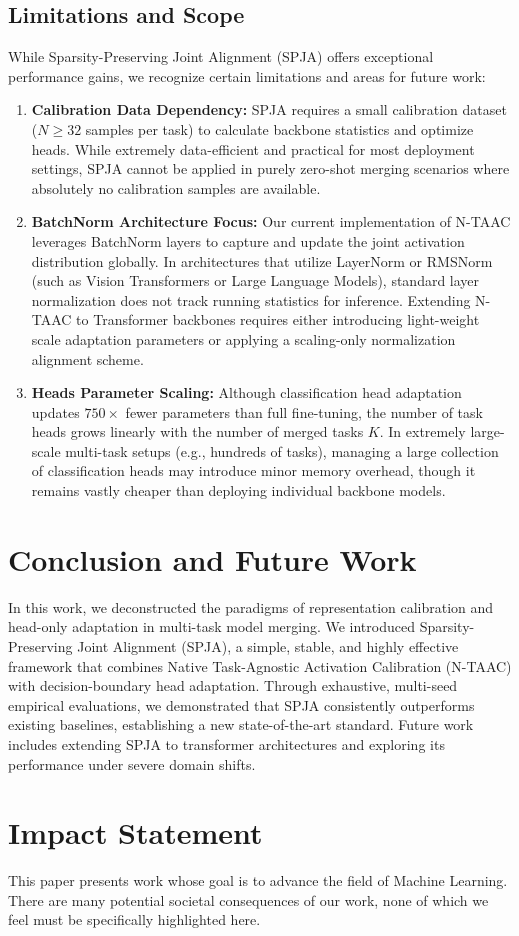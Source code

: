 \documentclass{article}
\theoremstyle{plain}
\theoremstyle{definition}
\theoremstyle{remark}
\begin{document}
\subsection{Limitations and Scope}
While Sparsity-Preserving Joint Alignment (SPJA) offers exceptional performance gains, we recognize certain limitations and areas for future work:
\begin{enumerate}
    \item \textbf{Calibration Data Dependency:} SPJA requires a small calibration dataset ($N \ge 32$ samples per task) to calculate backbone statistics and optimize heads. While extremely data-efficient and practical for most deployment settings, SPJA cannot be applied in purely zero-shot merging scenarios where absolutely no calibration samples are available.
    \item \textbf{BatchNorm Architecture Focus:} Our current implementation of N-TAAC leverages BatchNorm layers to capture and update the joint activation distribution globally. In architectures that utilize LayerNorm or RMSNorm (such as Vision Transformers or Large Language Models), standard layer normalization does not track running statistics for inference. Extending N-TAAC to Transformer backbones requires either introducing light-weight scale adaptation parameters or applying a scaling-only normalization alignment scheme.
    \item \textbf{Heads Parameter Scaling:} Although classification head adaptation updates $750\times$ fewer parameters than full fine-tuning, the number of task heads grows linearly with the number of merged tasks $K$. In extremely large-scale multi-task setups (e.g., hundreds of tasks), managing a large collection of classification heads may introduce minor memory overhead, though it remains vastly cheaper than deploying individual backbone models.
\end{enumerate}

\section{Conclusion and Future Work}
In this work, we deconstructed the paradigms of representation calibration and head-only adaptation in multi-task model merging. We introduced Sparsity-Preserving Joint Alignment (SPJA), a simple, stable, and highly effective framework that combines Native Task-Agnostic Activation Calibration (N-TAAC) with decision-boundary head adaptation. Through exhaustive, multi-seed empirical evaluations, we demonstrated that SPJA consistently outperforms existing baselines, establishing a new state-of-the-art standard. Future work includes extending SPJA to transformer architectures and exploring its performance under severe domain shifts.

\section*{Impact Statement}
This paper presents work whose goal is to advance the field of Machine Learning. There are many potential societal consequences of our work, none of which we feel must be specifically highlighted here.

\clearpage


\end{document}
